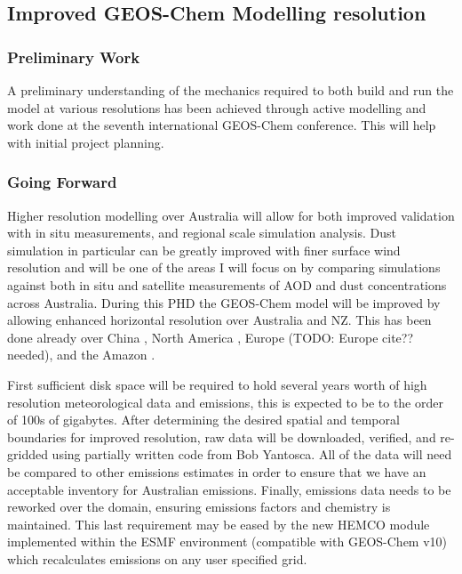 \subsection{Improved GEOS-Chem Modelling resolution}
\subsubsection{Preliminary Work}
A preliminary understanding of the mechanics required to both build and run the model at various resolutions has been achieved through active modelling and work done at the seventh international GEOS-Chem conference.
This will help with initial project planning.

\subsubsection{Going Forward}
Higher resolution modelling over Australia will allow for both improved validation with in situ measurements, and regional scale simulation analysis. 
Dust simulation in particular can be greatly improved with finer surface wind resolution and will be one of the areas I will focus on by comparing simulations against both in situ and satellite measurements of AOD and dust concentrations across Australia.
During this PHD the GEOS-Chem model will be improved by allowing enhanced horizontal resolution over Australia and NZ.
This has been done already over China \cite{Chen_2009,Wang_2004}, North America \cite{Zhang_2012}, Europe (TODO: Europe cite?? needed), and the Amazon \cite{Barkley_2013}.

First sufficient disk space will be required to hold several years worth of high resolution meteorological data and emissions, this is expected to be to the order of 100s of gigabytes.
After determining the desired spatial and temporal boundaries for improved resolution, raw data will be downloaded, verified, and re-gridded using partially written code from Bob Yantosca.
All of the data will need be compared to other emissions estimates in order to ensure that we have an acceptable inventory for Australian emissions.
Finally, emissions data needs to be reworked over the domain, ensuring emissions factors and chemistry is maintained.
This last requirement may be eased by the new HEMCO module implemented within the ESMF environment (compatible with GEOS-Chem v10) which recalculates emissions on any user specified grid.
  